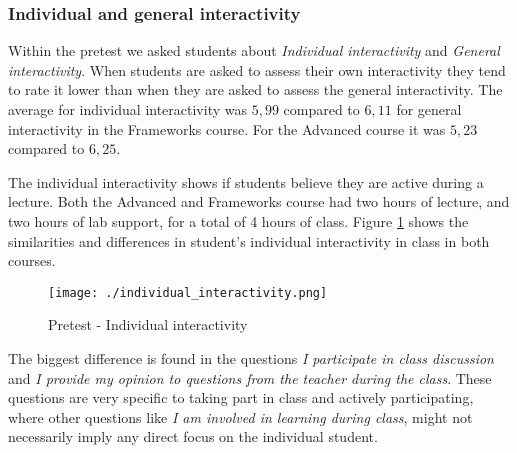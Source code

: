 \subsubsection*{Individual and general interactivity}\label{sec:individual_and_general}

Within the pretest we asked students about \emph{Individual interactivity} and \emph{General interactivity}. When students are asked to assess their own interactivity they tend to rate it lower than when they are asked to assess the general interactivity. The average for individual interactivity was $5,99$ compared to $6,11$ for general interactivity in the Frameworks course. For the Advanced course it was $5,23$ compared to $6,25$. 


The individual interactivity shows if students believe they are active during a lecture. Both the Advanced and Frameworks course had two hours of lecture, and two hours of lab support, for a total of 4 hours of class. Figure \ref{fig:individual_interactivity} shows the similarities and differences in student's individual interactivity in class in both courses.

 \begin{figure}[H]
  \centering
     \texttt{[image: ./individual\_interactivity.png]}
     \caption{Pretest - Individual interactivity}
     \label{fig:individual_interactivity}
 \end{figure}

The biggest difference is found in the questions \emph{I participate in class discussion} and \emph{I provide my opinion to questions from the teacher during the class}. These questions are very specific to taking part in class and actively participating, where other questions like \emph{I am involved in learning during class}, might not necessarily imply any direct focus on the individual student. 


